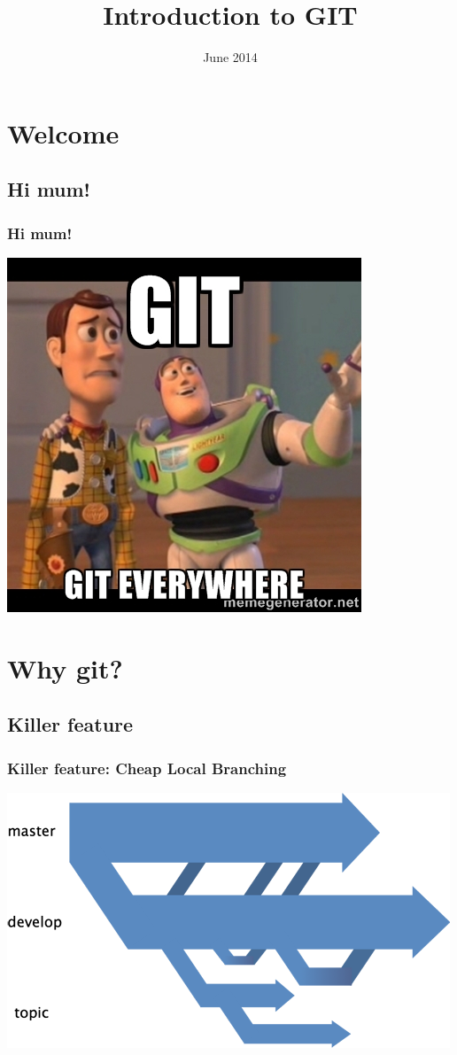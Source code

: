\documentclass{beamer}
\title{Introduction to GIT}
\date{June 2014}
\begin{document}


		
	\section{Welcome}
		\subsection{Hi mum!}
		\begin{frame}
			\frametitle{Hi mum!}
			\begin{center}
				\includegraphics[scale=0.7]{images/gitmeme}
			\end{center}
		\end{frame}
		


	\section{Why git?}
		\subsection{Killer feature}
		\begin{frame}
			\frametitle{Killer feature: Cheap Local Branching}
			\begin{center}
				\includegraphics[scale=1]{images/fact1}
			\end{center}
		\end{frame}
\end{document}

